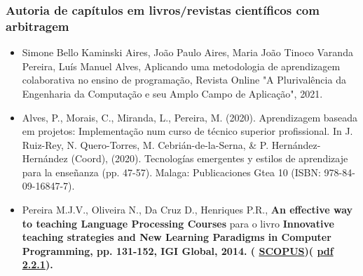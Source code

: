\documentclass[11pt]{article}
\begin{document}
\subsubsection{Autoria de capítulos em livros/revistas científicos com arbitragem}
\begin{itemize}
\item{ Simone Bello Kaminski Aires, João Paulo Aires, Maria João Tinoco Varanda Pereira, Luís Manuel Alves, Aplicando uma metodologia de aprendizagem colaborativa no ensino de programação, Revista Online "A Plurivalência da Engenharia da Computação e seu Amplo Campo de Aplicação", 2021.}
\item{ Alves, P., Morais, C., Miranda, L., Pereira, M. (2020). Aprendizagem baseada em projetos: Implementação num curso de técnico superior profissional. In J. Ruiz-Rey, N. Quero-Torres, M. Cebrián-de-la-Serna, & P. Hernández-Hernández (Coord), (2020). Tecnologías emergentes y estilos de aprendizaje para la enseñanza (pp. 47-57). Malaga: Publicaciones Gtea 10 (ISBN: 978-84-09-16847-7).}
\item{ Pereira M.J.V., Oliveira N., Da Cruz D., Henriques P.R., {
\bf{{An effective way to teaching Language Processing Courses}}} para o livro {
\bf{{Innovative teaching strategies and New Learning Paradigms in Computer Programming}}, pp. 131-152, IGI Global, 2014. (
\href{run:Publicacoes/PublicacoesSCOPUS.pdf}{SCOPUS})(
\href{run:Publicacoes/publicacoes/78.pdf}{pdf 2.2.1}).}}
\end{itemize}
\end{document}
